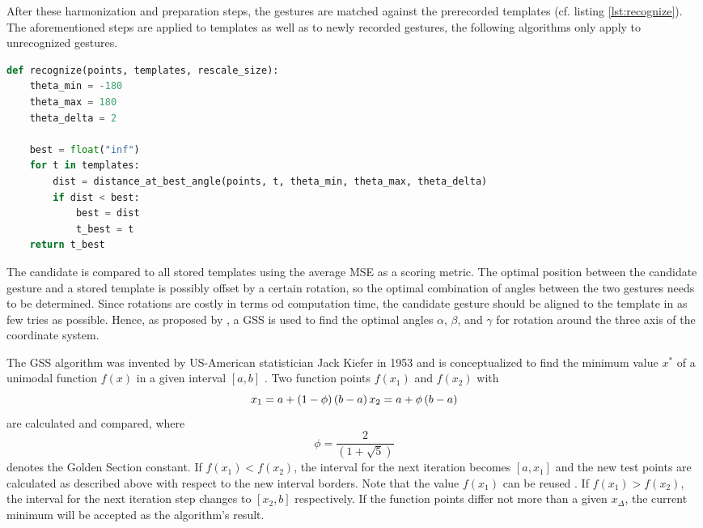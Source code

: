 After these harmonization and preparation steps, the gestures are matched against the prerecorded templates (cf. listing \ref{lst:recognize}). The aforementioned steps are applied to templates as well as to newly recorded gestures, the following algorithms only apply to unrecognized gestures.

\begin{lstlisting}[label=lst:recognize,language=python,frame=lt,caption=Matching candidate gesture against every template]
def recognize(points, templates, rescale_size):
	theta_min = -180
	theta_max = 180
	theta_delta = 2

	best = float("inf")
	for t in templates:
		dist = distance_at_best_angle(points, t, theta_min, theta_max, theta_delta)
		if dist < best:
			best = dist
			t_best = t
	return t_best
\end{lstlisting}

The candidate is compared to all stored templates using the average \ac{MSE} as a scoring metric. The optimal position between the candidate gesture and a stored template is possibly offset by a certain rotation, so the optimal combination of angles between the two gestures needs to be determined. Since rotations are costly in terms od computation time, the candidate gesture should be aligned to the template in as few tries as possible. Hence, as proposed by \cite{Kratz2010}, a \ac{GSS} is used to find the optimal angles $\alpha$, $\beta$, and $\gamma$ for rotation around the three axis of the coordinate system.

The \ac{GSS} algorithm was invented by US-American statistician Jack Kiefer in 1953  and is conceptualized to find the minimum value $x^*$ of a unimodal function $f\left(x\right)$ in a given interval $\left[a,b\right]$ \cite{Kiefer1953}. Two function points $f(x_1)$ and $f(x_2)$ with 
\[ x_1=a+\left(1-\phi\right)\left(b-a\right) \\
x_2=a+\phi\left(b-a\right) \]
are calculated and compared, where 
\[\phi=\frac{2}{\left(1+\sqrt{5}\right)}\]
denotes the Golden Section constant. If $f\left(x_1\right) < f\left(x_2\right)$, the interval for the next iteration becomes $\left[a,x_1\right]$ and the new test points are calculated as described above with respect to the new interval borders. Note that the value $f\left(x_1\right)$ can be reused \cite{chang2009n}. If $f\left(x_1\right) > f\left(x_2\right)$, the interval for the next iteration step changes to $\left[x_2, b\right]$ respectively. If the function points differ not more than a given $x_\Delta$, the current minimum will be accepted as the algorithm's result.

